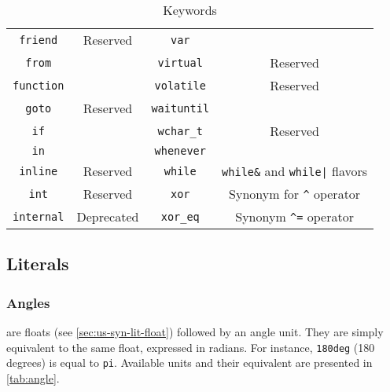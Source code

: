 \begin{table}[\floatpos]
\begin{tabular}{|c|c||c|c|}
    \lstinline"friend"            & Reserved                                &
    \lstinline"var"               &                                         \\
    \lstinline"from"              &                                         &
    \lstinline"virtual"           & Reserved                                \\
    \lstinline"function"          &                                         &
    \lstinline"volatile"          & Reserved                                \\
    \lstinline"goto"              & Reserved                                &
    \lstinline"waituntil"         &                                         \\
    \lstinline"if"                &                                         &
    \lstinline"wchar_t"           & Reserved                                \\
    \lstinline"in"                &                                         &
    \lstinline"whenever"          &                                         \\
    \lstinline"inline"            & Reserved                                &
    \lstinline"while"             & \lstinline|while&| and
                                    \lstinline-while|- flavors              \\
    \lstinline"int"               & Reserved                                &
    \lstinline"xor"               & Synonym for \lstinline|^| operator      \\
    \lstinline"internal"          & Deprecated                              &
    \lstinline"xor_eq"            & Synonym \lstinline|^=| operator         \\
    \hline
  \end{tabular}
  \caption{Keywords}
  \label{tab:keywords}
\end{table}
\renewcommand{\baselinestretch}{1}

\subsection{Literals}

\subsubsection{Angles}

 are floats (see \autoref{sec:us-syn-lit-float})
followed by an angle unit. They are simply equivalent to the same
float, expressed in radians. For instance, \lstinline|180deg| (180
degrees) is equal to \lstinline|pi|. Available units and their
equivalent are presented in \autoref{tab:angle}.

